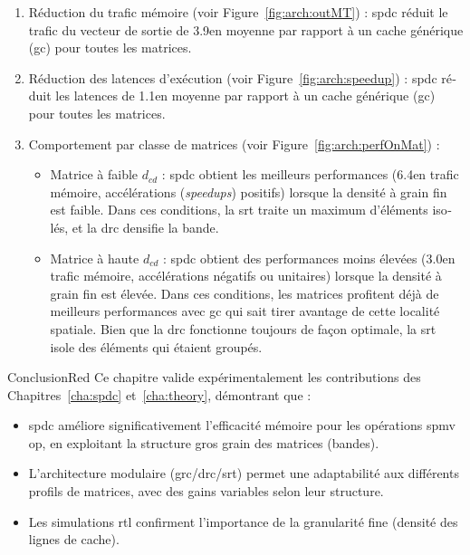 \begin{otherlanguage}{french}
\begin{enumerate}
    \item Réduction du trafic mémoire (voir Figure~\ref{fig:arch:outMT}) : \acrlong{spdc} réduit le trafic du vecteur de sortie de 3.9\tms en moyenne par rapport à un cache générique (\acrshort{gc}) pour toutes les matrices.
    \item Réduction des latences d'exécution (voir Figure~\ref{fig:arch:speedup}) : \acrlong{spdc} réduit les latences de 1.1\tms en moyenne par rapport à un cache générique (\acrshort{gc}) pour toutes les matrices.
    \item Comportement par classe de matrices (voir Figure~\ref{fig:arch:perfOnMat}) :
    \begin{itemize}
        \item Matrice à faible $d_\mathit{cd}$ : \acrlong{spdc} obtient les meilleurs performances (6.4\tms en trafic mémoire, accélérations (\textit{speedups}) positifs) lorsque la densité à grain fin est faible.
        Dans ces conditions, la \acrshort{srt} traite un maximum d'éléments isolés, et la \acrshort{drc} densifie la bande.
        \item Matrice à haute $d_\mathit{cd}$ : \acrlong{spdc} obtient des performances moins élevées (3.0\tms en trafic mémoire, accélérations négatifs ou unitaires) lorsque la densité à grain fin est élevée.
        Dans ces conditions, les matrices profitent déjà de meilleurs performances avec \acrshort{gc} qui sait tirer avantage de cette localité spatiale.
        Bien que la \acrshort{drc} fonctionne toujours de façon optimale, la \acrshort{srt} isole des éléments qui étaient groupés.
    \end{itemize}
\end{enumerate}

\bigskip
\begin{highlight}{Conclusion}{Red}
    Ce chapitre valide expérimentalement les contributions des Chapitres~\ref{cha:spdc} et~\ref{cha:theory}, démontrant que :
    \begin{itemize}
        \item \acrlong{spdc} améliore significativement l'efficacité mémoire pour les opérations \acrshort{spmv} \acrshort{op}, en exploitant la structure gros grain des matrices (bandes).
        \item L'architecture modulaire (\acrshort{grc}/\acrshort{drc}/\acrshort{srt}) permet une adaptabilité aux différents profils de matrices, avec des gains variables selon leur structure.
        \item Les simulations \acrshort{rtl} confirment l'importance de la granularité fine (densité des lignes de cache).
    \end{itemize}
\end{highlight}


\end{otherlanguage}
